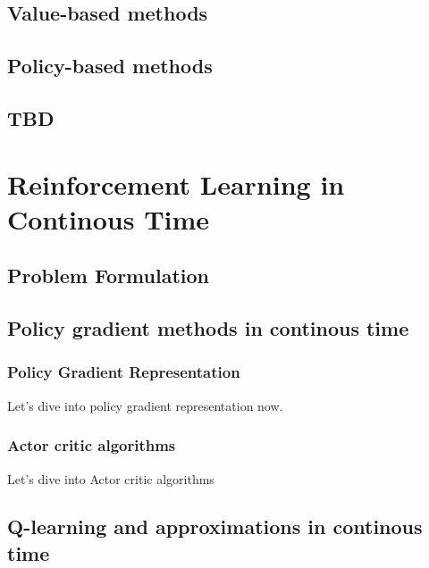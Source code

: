 \documentclass[
  10,
  letterpaper,
  DIV=11,
  numbers=noendperiod]{scrreport}
\theoremstyle{plain}
\theoremstyle{definition}
\theoremstyle{definition}
\theoremstyle{remark}
\begin{document}
\subsection{Value-based methods}\label{value-based-methods}

\subsection{Policy-based methods}\label{policy-based-methods}

\subsection{TBD}\label{tbd}

\subsection{}\label{section}

\section{Reinforcement Learning in Continous
Time}\label{reinforcement-learning-in-continous-time}

\subsection{Problem Formulation}\label{problem-formulation}

\subsection{Policy gradient methods in continous
time}\label{policy-gradient-methods-in-continous-time}

\subsubsection{Policy Gradient
Representation}\label{policy-gradient-representation}

Let's dive into policy gradient representation now.

\subsubsection{Actor critic algorithms}\label{actor-critic-algorithms}

Let's dive into Actor critic algorithms

\subsection{Q-learning and approximations in continous
time}\label{q-learning-and-approximations-in-continous-time}
\end{document}
